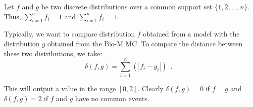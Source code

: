 Let $f$ and $g$ be two discrete distributions over a common support set $\{1,2,\ldots,n\}$.
Thus, $\sum_{i=1}^{n}f_{i} = 1$ and $\sum_{i=1}^{n}f_{i} = 1$.

Typically, we want to compare distribution $f$ obtained from a model with the distribution $g$ obtained from the Bio-M MC. To compare the distance between these two distributions, we take:
\begin{equation}
\delta(f, g) = \sum_{i=1}^{n}(|f_{i} - g_{i}|)\enspace{.}
\end{equation}

This will output a value in the range $[0, 2]$. 
Clearly $\delta(f, g)=0$ if $f=g$ and $\delta(f, g)=2$ if $f$ and $g$ have no common events.